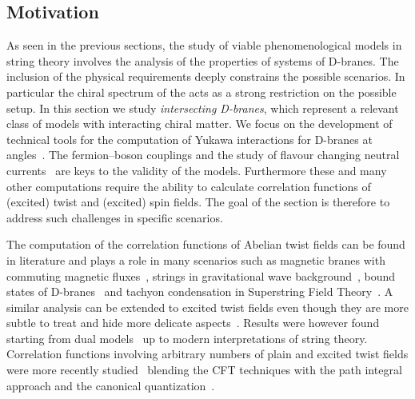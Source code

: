 \subsection{Motivation}

As seen in the previous sections, the study of viable phenomenological models in string theory involves the analysis of the properties of systems of D-branes.
The inclusion of the physical requirements deeply constrains the possible scenarios.
In particular the chiral spectrum of the \sm acts as a strong restriction on the possible setup.
In this section we study \emph{intersecting D-branes}, which represent a relevant class of models with interacting chiral matter.
We focus on the development of technical tools for the computation of Yukawa interactions for D-branes at angles~\cite{Chamoun:2004:FermionMassesMixing,Cremades:2003:YukawaCouplingsIntersecting,Cvetic:2010:BranesInstantonsIntersecting,Abel:2007:RealisticYukawaCouplings,Chen:2008:RealisticWorldIntersecting,Chen:2008:RealisticYukawaTextures,Abel:2005:OneloopYukawasIntersecting}.
The fermion--boson couplings and the study of flavour changing neutral currents~\cite{Abel:2003:FlavourChangingNeutral} are keys to the validity of the models.
Furthermore these and many other computations require the ability to calculate correlation functions of (excited) twist and (excited) spin fields.
The goal of the section is therefore to address such challenges in specific scenarios.

The computation of the correlation functions of Abelian twist fields can be found in literature and plays a role in many scenarios such as magnetic branes with commuting magnetic fluxes~\cite{Angelantonj:2000:TypeIStringsMagnetised,Bianchi:2005:OpenStoryMagnetic,Pesando:2010:OpenClosedString,Forste:2018:YukawaCouplingsMagnetized}, strings in gravitational wave background~\cite{Kiritsis:1994:StringPropagationGravitational,DAppollonio:2003:StringInteractionsGravitational}, bound states of D-branes~\cite{Gava:1997:BoundStatesBranes,Duo:2007:NewTwistField} and tachyon condensation in Superstring Field Theory~\cite{David:2000:TachyonCondensationD0,David:2001:TachyonCondensationUsing,Hashimoto:2003:RecombinationIntersectingDbranes}.
A similar analysis can be extended to excited twist fields even though they are more subtle to treat and hide more delicate aspects~\cite{Burwick:1991:GeneralYukawaCouplings,Stieberger:1992:YukawaCouplingsBosonic,Anastasopoulos:2012:LightStringyStates,Anastasopoulos:2013:ThreeFourpointCorrelators}.
Results were however found starting from dual models~\cite{Sciuto:1969:GeneralVertexFunction} up to modern interpretations of string theory.
Correlation functions involving arbitrary numbers of plain and excited twist fields were more recently studied~\cite{Pesando:2014:CorrelatorsArbitraryUntwisted,Pesando:2012:GreenFunctionsTwist,Pesando:2011:GeneratingFunctionAmplitudes} blending the CFT techniques with the path integral approach and the canonical quantization~\cite{Pesando:2008:MultibranesBoundaryStates,DiVecchia:2007:WrappedMagnetizedBranes,Pesando:2011:StringsArbitraryConstant,DiVecchia:2011:OpenStringsSystem,Pesando:2013:LightConeQuantization}.

